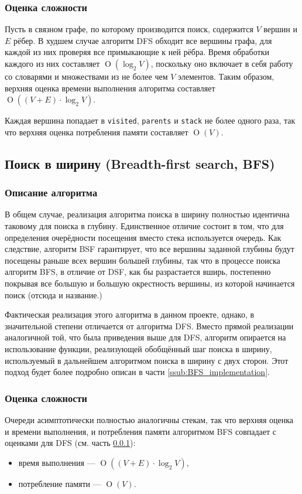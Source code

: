 \documentclass[a4paper, 12pt]{article}
\begin{document}
\subsubsection{Оценка сложности}
\label{ssub:DFS_complexity}
Пусть в связном графе, по которому производится поиск, содержится \({ V }\) вершин и \({ E }\) рёбер. В худшем случае алгоритм DFS обходит все вершины графа, для каждой из них проверяя все примыкающие к ней рёбра. Время обработки каждого из них составляет \({ \operatorname{O}(\log_2 V) }\), поскольку оно включает в себя работу со словарями и множествами из не более чем \({ V }\) элементов. Таким образом, верхняя оценка времени выполнения алгоритма составляет \({ \operatorname{O}((V + E) \cdot \log_2 V) }\).

Каждая вершина попадает в \verb|visited|, \verb|parents| и \verb|stack| не более одного раза, так что верхняя оценка потребления памяти составляет \({ \operatorname{O}(V) }\).

\subsection{Поиск в ширину (Breadth-first search, BFS)}
\subsubsection{Описание алгоритма}
В общем случае, реализация алгоритма поиска в ширину полностью идентична таковому для поиска в глубину. Единственное отличие состоит в том, что для определения очерёдности посещения вместо стека используется очередь. Как следствие, алгоритм BSF гарантирует, что все  вершины заданной глубины будут посещены раньше всех вершин большей глубины, так что в процессе поиска алгоритм BFS, в отличие от DSF, как бы разрастается вширь, постепенно покрывая все большую и большую окрестность вершины, из которой начинается поиск (отсюда и название.)

Фактическая реализация этого алгоритма в данном проекте, однако, в значительной степени отличается от алгоритма DFS. Вместо прямой реализации аналогичной той, что была приведения выше для DFS, алгоритм опирается на использование функции, реализующей обобщённый шаг поиска в ширину, используемый в дальнейшем алгоритмом поиска в ширину с двух сторон. Этот подход будет более подробно описан в части \ref{ssub:BFS_implementation}.

\subsubsection{Оценка сложности}
Очереди асимптотически полностью аналогичны стекам, так что верхняя оценка и времени выполнения, и потребления памяти алгоритмом BFS совпадает с оценками для DFS (см. часть \ref{ssub:DFS_complexity}):
\begin{itemize}
    \item время выполнения --- \({ \operatorname{O}((V + E) \cdot \log_2 V) }\),
    \item потребление памяти --- \({ \operatorname{O}(V) }\).
\end{itemize}
\end{document}
